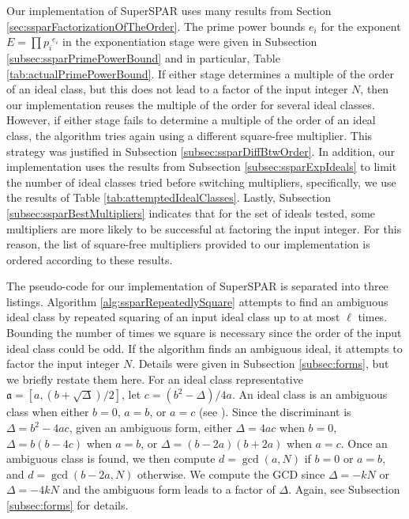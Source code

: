 \documentclass{ucalgthes1}
\theoremstyle{definition}
\newcommand{\ideal}{\mathfrak}
\begin{document}
Our implementation of SuperSPAR uses many results from Section \ref{sec:ssparFactorizationOfTheOrder}.  The prime power bounds $e_i$ for the exponent $E = \prod {p_i}^{e_i}$ in the exponentiation stage were given in Subsection \ref{subsec:ssparPrimePowerBound} and in particular, Table \ref{tab:actualPrimePowerBound}.  If either stage determines a multiple of the order of an ideal class, but this does not lead to a factor of the input integer $N$, then our implementation reuses the multiple of the order for several ideal classes.  However, if either stage fails to determine a multiple of the order of an ideal class, the algorithm tries again using a different square-free multiplier.  This strategy was justified in Subsection \ref{subsec:ssparDiffBtwOrder}.  In addition, our implementation uses the results from Subsection \ref{subsec:ssparExpIdeals} to limit the number of ideal classes tried before switching multipliers, specifically, we use the results of Table \ref{tab:attemptedIdealClasses}.  Lastly, Subsection \ref{subsec:ssparBestMultipliers} indicates that for the set of ideals tested, some multipliers are more likely to be successful at factoring the input integer.  For this reason, the list of square-free multipliers provided to our implementation is ordered according to these results.

The pseudo-code for our implementation of SuperSPAR is separated into three listings.  Algorithm \ref{alg:ssparRepeatedlySquare} attempts to find an ambiguous ideal class by repeated squaring of an input ideal class up to at most $\ell$ times.  Bounding the number of times we square is necessary since the order of the input ideal class could be odd.  If the algorithm finds an ambiguous ideal, it attempts to factor the input integer $N$.  Details were given in Subsection \ref{subsec:forms}, but we briefly restate them here.  For an ideal class representative $\ideal a = [a, (b + \sqrt\Delta)/2]$, let $c = (b^2 - \Delta)/4a$.  An ideal class is an ambiguous class when either $b = 0$, $a = b$, or $a = c$ (see \cite[p.303]{Schnorr1984}).  Since the discriminant is $\Delta = b^2 - 4ac$, given an ambiguous form, either $\Delta = 4ac$ when $b = 0$, $\Delta = b(b-4c)$ when $a = b$, or $\Delta = (b-2a)(b+2a)$ when $a = c$.  Once an ambiguous class is found, we then compute $d = \gcd(a, N)$ if $b = 0$ or $a = b$, and $d = \gcd(b-2a, N)$ otherwise.  We compute the GCD since $\Delta = -kN$ or $\Delta = -4kN$ and the ambiguous form leads to a factor of $\Delta$.  Again, see Subsection \ref{subsec:forms} for details.
\end{document}
